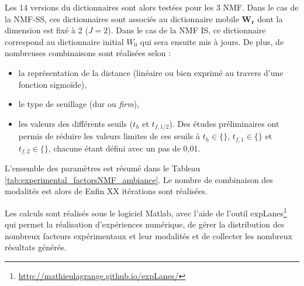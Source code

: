 Les 14 versions du dictionnaires sont alors testées pour les 3 NMF. Dans le cas de la NMF-SS, ces dictionnaires sont associés au dictionnaire mobile $\mathbf{W_r}$ dont la dimension est fixé à 2 ($J = 2$).
Dans le cas de la NMF IS, ce dictionnaire correspond au dictionnaire initial $W_0$ qui sera ensuite mis à jours. De plus, de nombreuses combinaisons sont réalisées selon  : 
\begin{itemize}
\item la représentation de la distance (linéaire ou bien exprimé au travers d'une fonction sigmoïde),
\item le type de seuillage (dur ou \textit{firm}),
\item les valeurs des différents seuils ($t_h$ et $t_{f,1/2}$). Des études préliminaires ont permis de réduire les valeurs limites de ces seuils à $t_h \in \lbrace \rbrace$, $t_{f,1} \in \lbrace \rbrace$ et $t_{f,2} \in \lbrace \rbrace$, chacune étant défini avec un pas de 0,01.
\end{itemize}

L'ensemble des paramètres est résumé dans le Tableau \ref{tab:experimental_factorsNMF_ambiance}. Le nombre de combinaison des modalités est alors de 
Enfin XX itérations sont réalisées. 

Les calculs sont réalisés sous le logiciel Matlab, avec l'aide de l'outil expLanes\footnote{\url{http://mathieulagrange.github.io/expLanes/}} qui permet la réalisation d'expériences numérique, de gérer la distribution des nombreux facteurs expérimentaux et leur modalités et de collecter les nombreux résultats générés.

